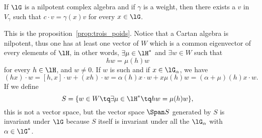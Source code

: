 \begin{lemma}
If $\lG$ is a nilpotent complex algebra and if $\gamma$ is a weight, then there exists a $v$ in $V_{\gamma}$ such that $c\cdot v=\gamma(x)v$ for every $x\in\lG$.
\end{lemma}
This is the proposition~\ref{prop:trois_poids}. Notice that a Cartan algebra is nilpotent, thus one has at least one vector of $W$ which is a common eigenvector of every elements of $\lH$, in other words, $\exists\mu\in\lH^*$ and $\exists w\in W$ such that
\begin{equation}
    hw=\mu(h)w
\end{equation}
for every $h\in\lH$, and $w\neq 0$. If $w$ is such and if $x\in\lG_{\alpha}$, we have
\begin{equation}
    (hx)\cdot w=[h,x]\cdot w+(xh)\cdot w=\alpha(h)x\cdot w+x\mu(h)w=(\alpha+\mu)(h)x\cdot w.
\end{equation}
If we define
\begin{equation}
    S=\{ w\in W\tq\exists\mu\in\lH^*\tq hw=\mu(h)w \},
\end{equation}
this is not a vector space, but the vector space $\Span S$ generated by $S$ is invariant under $\lG$ because $S$ itself is invariant under all the $\lG_{\alpha}$ with $\alpha\in\lG^*$.

